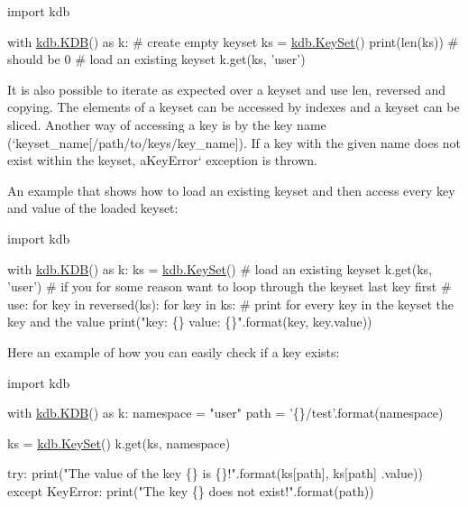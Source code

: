 \begin{DoxyCode}
\textcolor{keyword}{import} kdb

with \hyperlink{classkdb_1_1KDB}{kdb.KDB}() \textcolor{keyword}{as} k:
    \textcolor{comment}{# create empty keyset}
    ks = \hyperlink{classkdb_1_1KeySet}{kdb.KeySet}()
    print(len(ks))  \textcolor{comment}{# should be 0}
    \textcolor{comment}{# load an existing keyset}
    k.get(ks, \textcolor{stringliteral}{'user'})
\end{DoxyCode}


It is also possible to iterate as expected over a keyset and use {\ttfamily len}, {\ttfamily reversed} and copying. The elements of a keyset can be accessed by indexes and a keyset can be sliced. Another way of accessing a key is by the key name (`keyset\+\_\+name\mbox{[}\textquotesingle{}/path/to/keys/key\+\_\+name\textquotesingle{}\mbox{]}{\ttfamily ). If a key with the given name does not exist within the keyset, a}Key\+Error` exception is thrown.

An example that shows how to load an existing keyset and then access every key and value of the loaded keyset\+:


\begin{DoxyCode}
\textcolor{keyword}{import} kdb

with \hyperlink{classkdb_1_1KDB}{kdb.KDB}() \textcolor{keyword}{as} k:
    ks = \hyperlink{classkdb_1_1KeySet}{kdb.KeySet}()
    \textcolor{comment}{# load an existing keyset}
    k.get(ks, \textcolor{stringliteral}{'user'})
    \textcolor{comment}{# if you for some reason want to loop through the keyset last key first}
    \textcolor{comment}{# use: for key in reversed(ks):}
    \textcolor{keywordflow}{for} key \textcolor{keywordflow}{in} ks:
        \textcolor{comment}{# print for every key in the keyset the key and the value}
        print(\textcolor{stringliteral}{"key: \{\} value: \{\}"}.format(key, key.value))
\end{DoxyCode}


Here an example of how you can easily check if a key exists\+:


\begin{DoxyCode}
\textcolor{keyword}{import} kdb

with \hyperlink{classkdb_1_1KDB}{kdb.KDB}() \textcolor{keyword}{as} k:
    namespace = \textcolor{stringliteral}{"user"}
    path = \textcolor{stringliteral}{'\{\}/test'}.format(namespace)

    ks = \hyperlink{classkdb_1_1KeySet}{kdb.KeySet}()
    k.get(ks, namespace)

    \textcolor{keywordflow}{try}:
        print(\textcolor{stringliteral}{"The value of the key \{\} is \{\}!"}.format(ks[path], ks[path]
                                                      .value))
    \textcolor{keywordflow}{except} KeyError:
        print(\textcolor{stringliteral}{"The key \{\} does not exist!"}.format(path))
\end{DoxyCode}


